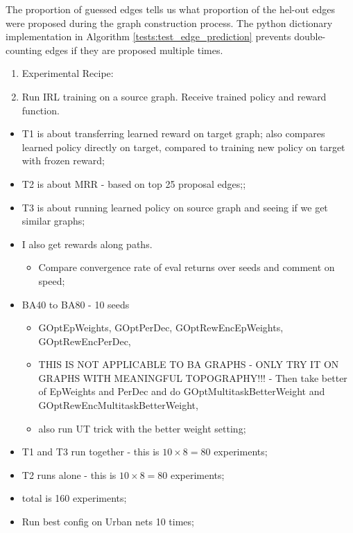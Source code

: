 \documentclass{report}
\numberwithin{equation}{section}
\numberwithin{figure}{section}
\numberwithin{table}{section}
\numberwithin{algorithm}{section}
\begin{document}
The proportion of guessed edges tells us what proportion of the 
hel-out edges were proposed during the graph construction process. 
The python dictionary implementation in Algorithm \ref{tests:test_edge_prediction} 
prevents double-counting edges if they are proposed multiple times.

\begin{enumerate}
  \item Experimental Recipe:
  \item Run IRL training on a source graph. Receive trained policy 
  and reward function.
\end{enumerate}
\begin{itemize}
  \item T1 is about transferring learned reward on target graph;
  also compares learned policy directly on target, compared to 
  training new policy on target with frozen reward;
  \item T2 is about MRR - based on top 25 proposal edges;;
  \item T3 is about running learned policy on source graph and 
  seeing if we get similar graphs;
  \item I also get rewards along paths.
  \begin{itemize}
    \item Compare convergence rate of eval returns over seeds
      and comment on speed;
  \end{itemize}
  \item BA40 to BA80 - 10 seeds
  \begin{itemize}
    \item GOptEpWeights, GOptPerDec, 
      GOptRewEncEpWeights, GOptRewEncPerDec,
    \item THIS IS NOT APPLICABLE TO BA GRAPHS - ONLY TRY IT ON GRAPHS 
      WITH MEANINGFUL TOPOGRAPHY!!! - Then take better of EpWeights and PerDec and do 
      GOptMultitaskBetterWeight and GOptRewEncMultitaskBetterWeight,
    \item also run UT trick with the better weight setting;
  \end{itemize}
    
  \item T1 and T3 run together - this is $10\times 8=80$ experiments;
  \item T2 runs alone - this is $10\times 8=80$ experiments;
  \item total is 160 experiments;
  \item  Run best config on Urban nets 10 times;
\end{itemize}
\end{document}
